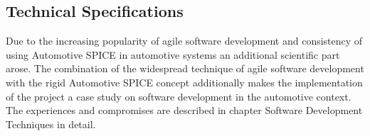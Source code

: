\subsection{Technical Specifications}
Due to the increasing popularity of agile software development and consistency of using Automotive SPICE in automotive systems 
an additional scientific part arose. The combination of  the  widespread technique of agile software development with the  rigid Automotive 
SPICE concept additionally makes the implementation of the project a case study on software development in the automotive context. 
The experiences and compromises are described in chapter Software Development Techniques  in detail. 

